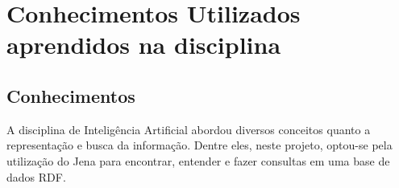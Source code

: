 \chapter{Conhecimentos Utilizados aprendidos na disciplina}\label{ch-aula}

\section{Conhecimentos}

A disciplina de Inteligência Artificial abordou diversos conceitos quanto a representação e busca da informação. Dentre eles, neste projeto, optou-se pela utilização do Jena para encontrar, entender e fazer consultas em uma base de dados RDF.